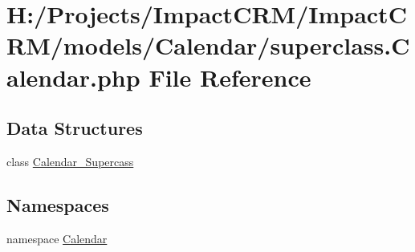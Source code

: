 \hypertarget{superclass_8Calendar_8php}{
\section{H:/Projects/ImpactCRM/ImpactCRM/models/Calendar/superclass.Calendar.php File Reference}
\label{superclass_8Calendar_8php}
}
\subsection*{Data Structures}
\begin{DoxyCompactItemize}
\item 
class \hyperlink{classCalendar__Supercass}{Calendar\_\-Supercass}
\end{DoxyCompactItemize}
\subsection*{Namespaces}
\begin{DoxyCompactItemize}
\item 
namespace \hyperlink{namespaceCalendar}{Calendar}
\end{DoxyCompactItemize}
